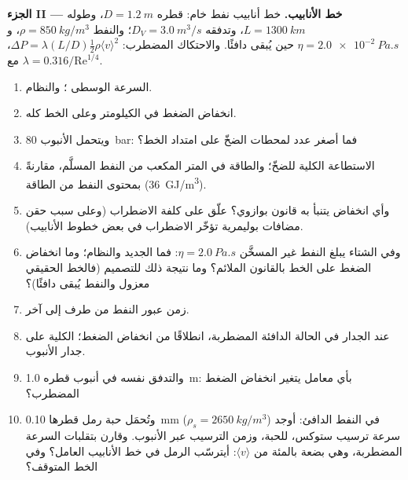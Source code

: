 \begin{problem}
\medskip
\noindent\textbf{الجزء II --- خط الأنابيب.}
خط أنابيب نفط خام: قطره $D = \qty{1.2}{m}$، وطوله $L = \qty{1300}{km}$،
وتدفقه $D_V = \qty{3.0}{m^3/s}$؛ والنفط $\rho = \qty{850}{kg/m^3}$، و $\eta =
\qty{2.0e-2}{Pa.s}$ حين يُبقى دافئًا. والاحتكاك المضطرب: $\Delta P = \lambda
(L/D)\tfrac12\rho\langle v\rangle^2$، مع $\lambda = 0.316/\mathrm{Re}^{1/4}$.
\begin{enumerate}[resume]
  \item السرعة الوسطى ؛ والنظام.
  \item انخفاض الضغط في الكيلومتر وعلى الخط كله.
  \item ويتحمل الأنبوب \qty{80}{bar}: فما أصغر عدد لمحطات الضخّ
        على امتداد الخط؟
  \item الاستطاعة الكلية للضخّ؛ والطاقة في المتر المكعب من
        النفط المسلَّم، مقارنةً بمحتوى النفط من الطاقة (\qty{36}{GJ/m^3}).
  \item وأي انخفاض يتنبأ به قانون بوازوي؟ علّق على كلفة
        الاضطراب (وعلى سبب حقن مضافات بوليمرية تؤخّر
        الاضطراب في بعض خطوط الأنابيب).
  \item وفي الشتاء يبلغ النفط غير المسخَّن $\eta = \qty{2.0}{Pa.s}$:
        فما  الجديد والنظام؛ وما انخفاض الضغط على الخط
        بالقانون الملائم؟ وما نتيجة ذلك للتصميم (فالخط الحقيقي
        معزول والنفط يُبقى دافئًا)؟
  \item زمن عبور النفط من طرف إلى آخر.
  \item {} عند الجدار في الحالة الدافئة المضطربة،
        انطلاقًا من انخفاض الضغط؛  الكلية على جدار الأنبوب.
  \item والتدفق نفسه في أنبوب قطره \qty{1.0}{m}: بأي معامل يتغير
        انخفاض الضغط المضطرب؟
  \item وتُحمَل حبة رمل قطرها \qty{0.10}{mm} ($\rho_s = \qty{2650}{kg/m^3}$)
        في النفط الدافئ: أوجد سرعة ترسيب ستوكس، 
        للحبة، وزمن الترسيب عبر الأنبوب. وقارن بتقلبات السرعة
        المضطربة، وهي بضعة بالمئة من $\langle v
        \rangle$: أيترسّب الرمل في خط الأنابيب العامل؟ وفي
        الخط المتوقف؟
\end{enumerate}


\end{problem}
